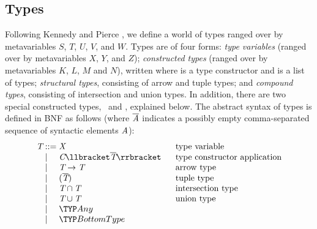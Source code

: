 \subsection{Types}

Following Kennedy and Pierce \cite{kennedy07},
we define a world of types ranged over by metavariables $S$, $T$, $U$, $V$, and $W$. 
Types are of four forms: 
\emph{type variables} 
(ranged over by metavariables $X$, $Y$, and $Z$);
\emph{constructed types} 
(ranged over by metavariables $K$, $L$, $M$ and $N$), 
written  
where  is a type constructor 
and  is a list of types; 
\emph{structural types},
consisting of arrow and tuple types;
and \emph{compound types},
consisting of intersection and union types. 
In addition, 
there are two special constructed types, \Any\ and \BottomType, explained below.
The abstract syntax of types is defined in BNF as follows
(where $\bar{\emph{A}}$ indicates 
a possibly empty comma-separated sequence of syntactic elements $\emph{A}$):
\[
\begin{array}{@{}l@{\;}l@{\;}l@{\;\;\;\;\;\;}l@{}}
\emph{T} &::=& \emph{X} & \hbox{\rm type variable}\\
&\mid& \emph{C}\llbracket\bar{\emph{T}}\rrbracket & \hbox{\rm type constructor application}\\
&\mid& \emph{T} \rightarrow \emph{T} & \hbox{\rm arrow type}\\
&\mid& ( \bar{\emph{T}} ) & \hbox{\rm tuple type}\\
&\mid& \emph{T} \cap \emph{T} & \hbox{\rm intersection type}\\
&\mid& \emph{T} \cup \emph{T} & \hbox{\rm union type}\\
&\mid& \Any \\
&\mid& \BottomType \\
\end{array}
\]

